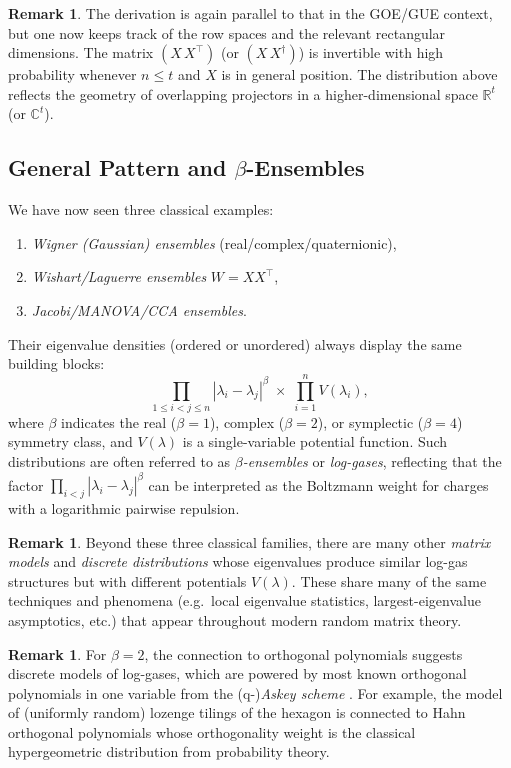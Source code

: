 \documentclass[letterpaper,11pt,oneside,reqno]{book}
\numberwithin{equation}{chapter}  %
\theoremstyle{definition}
\newtheorem{remark}[proposition]{Remark}
\begin{document}
\begin{remark}
The derivation is again parallel to that in the GOE/GUE context, but one now keeps track of the row spaces and the relevant rectangular dimensions.  The matrix \((X\,X^\top)\) (or \((X\,X^\dagger)\)) is invertible with high probability whenever \(n\le t\) and \(X\) is in general position.  The distribution above reflects the geometry of overlapping projectors in a higher-dimensional space \(\mathbb{R}^t\) (or \(\mathbb{C}^t\)).
\end{remark}


\subsection{General Pattern and \texorpdfstring{\(\beta\)}{beta}-Ensembles}
\label{lecture3:sec:general_pattern_log_gas}

We have now seen three classical examples:
\begin{enumerate}[\(\bullet\)]
\item \emph{Wigner (Gaussian) ensembles} (real/complex/quaternionic),
\item \emph{Wishart/Laguerre ensembles} \(W = X X^\top\),
\item \emph{Jacobi/MANOVA/CCA ensembles}.
\end{enumerate}
Their eigenvalue densities (ordered or unordered) always display the same building blocks:
\[
  \prod_{1\le i<j\le n}
  |\lambda_i - \lambda_j|^{\beta}
  \;\times\;
  \prod_{i=1}^n V(\lambda_i),
\]
where \(\beta\) indicates the real (\(\beta=1\)), complex (\(\beta=2\)), or symplectic (\(\beta=4\)) symmetry class, and \(V(\lambda)\) is a single-variable potential function.
Such distributions are often referred to as \emph{\(\beta\)-ensembles} or \emph{log-gases}, reflecting that the factor \(\prod_{i<j}|\lambda_i - \lambda_j|^\beta\) can be interpreted as the Boltzmann weight for charges with a logarithmic pairwise repulsion.

\begin{remark}
	Beyond these three classical families, there are many other \emph{matrix models}
and \emph{discrete distributions}
whose eigenvalues produce similar log-gas structures but with different potentials \(V(\lambda)\).  These share many of the same techniques and phenomena (e.g.\ local eigenvalue statistics, largest-eigenvalue asymptotics, etc.) that appear throughout modern random matrix theory.
\end{remark}

\begin{remark}
For $\beta=2$, the connection to orthogonal polynomials
suggests discrete models of log-gases, which are powered by most
known orthogonal polynomials in one variable from the
(q-)\emph{Askey scheme} \cite{Koekoek1996}. For example,
the model of (uniformly random) lozenge tilings of the hexagon is
connected to Hahn orthogonal polynomials \cite{gorin2021lectures}
whose orthogonality weight is the classical
hypergeometric distribution from probability theory.
\end{remark}
\end{document}
